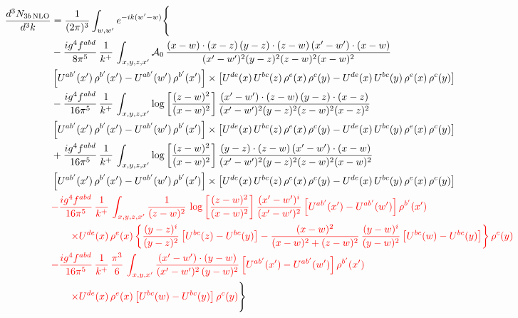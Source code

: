 \documentclass[9pt]{article}
\numberwithin{equation}{section}
\newcommand{\chg}[1]{{\color{red}#1}}
\begin{document}
\begin{align}
\frac{d^{3}N_{3b\,\rm NLO}}{d^{3}k} & = \frac{1}{(2\pi)^{3}}\int_{w,w'}e^{-ik(w'-w)}\Bigg\{\notag \\
&-\frac{ig^{4}f^{abd}}{8\pi^{5}}\,\frac{1}{k^{+}}\,\int_{x,y,z,x'}\mathcal{A}_{0}\,
\frac{(x-w)\cdot(x-z)\,(y-z)\cdot(z-w)\,(x'-w')\cdot(x-w)}{(x'-w')^{2}(y-z)^{2}(z-w)^{2}(x-w)^{2}}\notag \\ & \left[U^{ab'}(x')\,\rho^{b'}(x')-U^{ab'}(w')\, \rho^{b'}(x')\right]\times \left[U^{de}(x)\,U^{bc}(z)\, \rho^{e}(x)\,\rho^{c}(y)-U^{de}(x)\,U^{bc}(y)\,\rho^{e}(x)\,\rho^{c}(y)\right] \notag \\
& -\frac{ig^{4}f^{abd}}{16\pi^{5}}\,\frac{1}{k^{+}}\,\int_{x,y,z,x'}\log{\left[\frac{(z-w)^{2}}{(x-w)^{2}}\right]}\,
\frac{(x'-w')\cdot(z-w)\,(y-z)\cdot(x-z)}{(x'-w')^{2}(y-z)^{2}(z-w)^{2}(x-z)^{2}}\notag \\
&\left[U^{ab'}(x')\,\rho^{b'}(x')-U^{ab'}(w')\, \rho^{b'}(x')\right]\times \left[U^{de}(x)\,U^{bc}(z)\, \rho^{e}(x)\,\rho^{c}(y)-U^{de}(x)\,U^{bc}(y)\,\rho^{e}(x)\,\rho^{c}(y)\right] \notag \\
&+ \frac{ig^{4}f^{abd}}{16\pi^{5}}\,\frac{1}{k^{+}}\,\int_{x,y,z,x'}\log{\left[\frac{(z-w)^{2}}{(x-w)^{2}}\right]}\,
\frac{(y-z)\cdot(z-w)\,(x'-w')\cdot(x-w)}{(x'-w')^{2}(y-z)^{2}(z-w)^{2}(x-w)^{2}}\notag \\ 
& \left[U^{ab'}(x')\,\rho^{b'}(x')-U^{ab'}(w')\, \rho^{b'}(x')\right]\times \left[U^{de}(x)\,U^{bc}(z)\, \rho^{e}(x)\,\rho^{c}(y)-U^{de}(x)\,U^{bc}(y)\,\rho^{e}(x)\,\rho^{c}(y)\right]\notag \\ & \chg{-\frac{ig^{4}f^{abd}}{16\pi^{5}}\,\frac{1}{k^{+}}\,\int_{x,y,z,x'}\frac{1}{(z-w)^{2}}\,\log{\left[\frac{(z-w)^{2}}{(x-w)^{2}}\right]}\,\frac{(x'-w')^{i}}{(x'-w')^{2}}\left[U^{ab'}(x')-U^{ab'}(w')\right]\rho^{b'}(x')}\notag \\ & \chg{\qquad\times U^{de}(x)\,\rho^{e}(x)\left\{\frac{(y-z)^{i}}{(y-z)^{2}}\left[U^{bc}(z)-U^{bc}(y)\right]-\frac{(x-w)^{2}}{(x-w)^{2}+(z-w)^{2}}\,\frac{(y-w)^{i}}{(y-w)^{2}}\left[U^{bc}(w)-U^{bc}(y)\right]\right\}\rho^{c}(y)}\notag \\ & \chg{-\frac{ig^{4}f^{abd}}{16\pi^{5}}\,\frac{1}{k^{+}}\,\frac{\pi^{3}}{6}\,\int_{x,y,x'}\frac{(x'-w')\cdot(y-w)}{(x'-w')^{2}\,(y-w)^{2}}\left[U^{ab'}(x')-U^{ab'}(w')\right]\rho^{b'}(x')}\notag \\ & \chg{\qquad\times U^{de}(x)\,\rho^{e}(x)\left[U^{bc}(w)-U^{bc}(y)\right]\rho^{c}(y)}\Bigg\}
\end{align}
\end{document}
